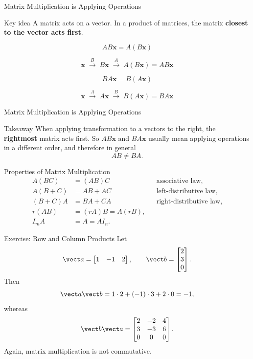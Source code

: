 \begin{frame}{Matrix Multiplication is Applying Operations}

\begin{block}{Key idea}
A matrix acts on a vector.  
In a product of matrices, the matrix \textbf{closest to the vector acts first}.
\end{block}

\[
AB\mathbf{x} = A(B\mathbf{x})
\]

\[
\mathbf{x}
\;\xrightarrow{\;B\;}\;
B\mathbf{x}
\;\xrightarrow{\;A\;}\;
A(B\mathbf{x}) = AB\mathbf{x}
\]

\vspace{0.5em}

\[
BA\mathbf{x} = B(A\mathbf{x})
\]

\[
\mathbf{x}
\;\xrightarrow{\;A\;}\;
A\mathbf{x}
\;\xrightarrow{\;B\;}\;
B(A\mathbf{x}) = BA\mathbf{x}
\]
\end{frame}
\begin{frame}{Matrix Multiplication is Applying Operations}

\begin{alertblock}{Takeaway}
When applying transformation to a vectors to the right, the \textbf{rightmost} matrix acts first.  
So \(AB\mathbf{x}\) and \(BA\mathbf{x}\) usually mean applying operations in a different order, and therefore in general
\[
AB \ne BA.
\]
\end{alertblock}

\end{frame}
\begin{frame}{Properties of Matrix Multiplication}
\begin{align*}
A(BC)&=(AB)C &&\text{associative law},\\
A(B+C)&=AB+AC &&\text{left-distributive law},\\
(B+C)A&=BA+CA &&\text{right-distributive law},\\
r(AB)&=(rA)B=A(rB),\\
I_mA&=A=AI_n.
\end{align*}
\end{frame}

\begin{frame}{Exercise: Row and Column Products}
Let
\[
\vect a=\begin{bmatrix}1&-1&2\end{bmatrix},\qquad
\vect b=\begin{bmatrix}2\\3\\0\end{bmatrix}.
\]
Then
\[
\vect a\vect b=1\cdot2+(-1)\cdot3+2\cdot0=-1,
\]
whereas
\[
\vect b\vect a=
\begin{bmatrix}
2&-2&4\\3&-3&6\\0&0&0
\end{bmatrix}.
\]
Again, matrix multiplication is not commutative.
\end{frame}

